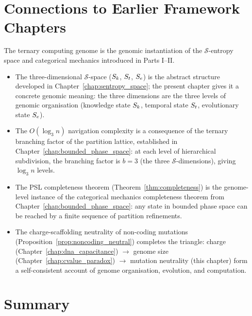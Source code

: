 \section{Connections to Earlier Framework Chapters}
\label{sec:ch17_connections}

The ternary computing genome is the genomic instantiation of the
$\mathcal{S}$-entropy space and categorical mechanics introduced in
Parts I--II.

\begin{itemize}
  \item The three-dimensional $\mathcal{S}$-space ($S_k$, $S_t$, $S_e$) is
    the abstract structure developed in Chapter~\ref{chap:sentropy_space};
    the present chapter gives it a concrete genomic meaning: the three
    dimensions are the three levels of genomic organisation (knowledge
    state $S_k$, temporal state $S_t$, evolutionary state $S_e$).
  \item The $O(\log_3 n)$ navigation complexity is a consequence of the
    ternary branching factor of the partition lattice, established in
    Chapter~\ref{chap:bounded_phase_space}: at each level of hierarchical
    subdivision, the branching factor is $b = 3$ (the three $\mathcal{S}$-dimensions),
    giving $\log_3 n$ levels.
  \item The PSL completeness theorem (Theorem~\ref{thm:completeness}) is
    the genome-level instance of the categorical mechanics completeness
    theorem from Chapter~\ref{chap:bounded_phase_space}: any state in
    bounded phase space can be reached by a finite sequence of
    partition refinements.
  \item The charge-scaffolding neutrality of non-coding mutations
    (Proposition~\ref{prop:noncoding_neutral}) completes the triangle:
    charge (Chapter~\ref{chap:dna_capacitance}) $\to$ genome size
    (Chapter~\ref{chap:cvalue_paradox}) $\to$ mutation neutrality
    (this chapter) form a self-consistent account of genome organisation,
    evolution, and computation.
\end{itemize}

\section{Summary}
\label{sec:ch17_summary}

